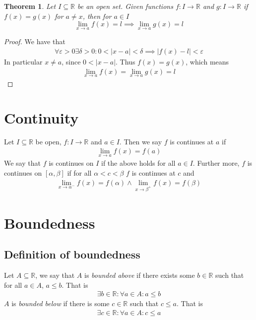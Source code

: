 \documentclass{article}
\theoremstyle{plain}
\newtheorem{theorem}{Theorem}
\theoremstyle{definition}
\begin{document}
\begin{theorem}
	Let $I \subseteq \mathbb{R}$ be an open set. Given functions $f: I
	\rightarrow \mathbb{R}$ and $g: I \rightarrow \mathbb{R}$ if $f(x)=g(x)$ for
	$a \neq x$, then for $a \in I$
	\[\lim_{x \rightarrow a} f(x) = l \implies \lim_{x \rightarrow a} g(x) = l\]
\end{theorem}
\begin{proof}
We have that
\begin{align*}
	\forall \varepsilon > 0 \exists \delta > 0: 0<|x-a|<\delta 
	\implies |f(x)-l| < \varepsilon
\end{align*}
In particular $x \neq a$, since $0<|x-a|$. Thus $f(x)=g(x)$, which means
\begin{align*}
	\lim_{x \rightarrow a} f(x) = \lim_{x \rightarrow a} g(x) = l
\end{align*}

\end{proof}

\section{Continuity}
Let $I \subseteq \mathbb{R}$ be open, $f: I \rightarrow \mathbb{R}$ and 
$a \in I$. Then we say $f$ is continues at $a$ if
\begin{align}
	\lim_{x \rightarrow a} f(x)=f(a)
\end{align}
We say that $f$ is continues on $I$ if the above holds for all $a \in I$.
Further more, $f$ is continues on $[\alpha,\beta]$ if for all 
$\alpha < c < \beta$ $f$ is continues at $c$ and
\begin{align}
	\lim_{x \rightarrow \alpha^-} f(x)=f(\alpha) \land 
	\lim_{x \rightarrow \beta^+} f(x)=f(\beta)
\end{align}

\section{Boundedness}
\subsection{Definition of boundedness}
Let $A \subseteq \mathbb{R}$, we say that $A$ is \textit{bounded above} if there
exists some $b \in \mathbb{R}$ such that for all $a \in A$, $a \leq b$. That is
\begin{align*}
	\exists b \in \mathbb{R}: \forall a \in A: a \leq b
\end{align*}
$A$ is \textit{bounded below} if there is some $c \in \mathbb{R}$ such that $c
\leq a$. That is
\begin{align*}
	\exists c \in \mathbb{R}: \forall a \in A: c \leq a
\end{align*}
\end{document}
